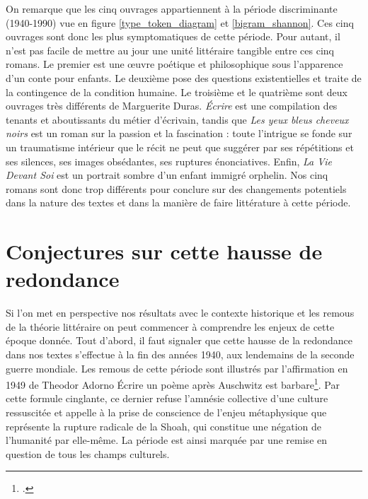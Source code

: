 \documentclass[a4paper,twoside,12pt]{book}
\begin{document}
On remarque que les cinq ouvrages appartiennent à la période discriminante (1940-1990) vue en figure \ref{type_token_diagram} et \ref{bigram_shannon}. Ces cinq ouvrages sont donc les plus symptomatiques de cette période. Pour autant, il n'est pas facile de mettre au jour une unité littéraire tangible entre ces cinq romans. Le premier est une œuvre poétique et philosophique sous l'apparence d'un conte pour enfants. Le deuxième pose des questions existentielles et traite de la contingence de la condition humaine. Le troisième et le quatrième sont deux ouvrages très différents de Marguerite Duras. \og\textit{Écrire}\fg{} est une compilation des tenants et aboutissants du métier d'écrivain, tandis que \og\textit{Les yeux bleus cheveux noirs}\fg{} est un roman sur la passion et la fascination : toute l’intrigue se fonde sur un traumatisme intérieur que le récit ne peut que suggérer par ses répétitions et ses silences, ses images obsédantes, ses ruptures énonciatives. Enfin, \og\textit{La Vie Devant Soi}\fg{} est un portrait sombre d’un enfant immigré orphelin. Nos cinq romans sont donc trop différents pour conclure sur des changements potentiels dans la nature des textes et dans la manière de faire littérature à cette période. 

\section{Conjectures sur cette hausse de redondance}

Si l'on met en perspective nos résultats avec le contexte historique et les remous de la théorie littéraire on peut commencer à comprendre les enjeux de cette époque donnée. Tout d'abord, il faut signaler que cette hausse de la redondance dans nos textes s'effectue à la fin des années 1940, aux lendemains de la seconde guerre mondiale. Les remous de cette période sont illustrés par l'affirmation en 1949 de Theodor Adorno \og Écrire un poème après Auschwitz est barbare\fg\footcites{adorno_prismes_2003}. Par cette formule cinglante, ce dernier refuse l'amnésie collective d’une \og culture  ressuscitée\fg{} et appelle à la prise de conscience de l’enjeu métaphysique que représente la rupture radicale de la Shoah, qui constitue une négation de l’humanité par elle-même. La période est ainsi marquée par une remise en question de tous les champs culturels. 
\end{document}
